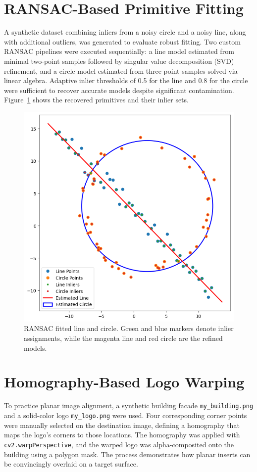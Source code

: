 ﻿\documentclass[11pt,a4paper]{article}
\begin{document}
\section{RANSAC-Based Primitive Fitting}
A synthetic dataset combining inliers from a noisy circle and a noisy line, along with additional outliers, was generated to evaluate robust fitting. Two custom RANSAC pipelines were executed sequentially: a line model estimated from minimal two-point samples followed by singular value decomposition (SVD) refinement, and a circle model estimated from three-point samples solved via linear algebra. Adaptive inlier thresholds of 0.5 for the line and 0.8 for the circle were sufficient to recover accurate models despite significant contamination. Figure~\ref{fig:ransac} shows the recovered primitives and their inlier sets.

\begin{figure}[H]
  \centering
  \includegraphics[width=0.7\linewidth]{ransac_fit.png}
  \caption{RANSAC fitted line and circle. Green and blue markers denote inlier assignments, while the magenta line and red circle are the refined models.}
  \label{fig:ransac}
\end{figure}

\section{Homography-Based Logo Warping}
To practice planar image alignment, a synthetic building facade \texttt{my\_building.png} and a solid-color logo \texttt{my\_logo.png} were used. Four corresponding corner points were manually selected on the destination image, defining a homography that maps the logo's corners to those locations. The homography was applied with \texttt{cv2.warpPerspective}, and the warped logo was alpha-composited onto the building using a polygon mask. The process demonstrates how planar inserts can be convincingly overlaid on a target surface.
\end{document}
